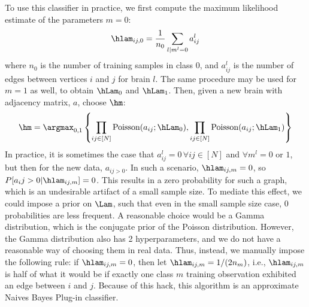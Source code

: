 \documentclass{article}
\begin{document}
To use this classifier in practice, we first compute the maximum likelihood estimate of the parameters $m=0$:
\begin{align}
	\hlam_{ij,0} = \frac{1}{n_0}\sum_{l | m^l = 0} a_{ij}^l
\end{align}
where $n_0$ is the number of training samples in class $0$, and $a_{ij}^l$ is the number of edges between vertices $i$ and $j$ for brain $l$.  The same procedure may be used for $m=1$ as well, to obtain $\hLam_0$ and $\hLam_1$.  Then, given a new brain with adjacency matrix, $a$, choose $\hm$:
\begin{align}
	\hm = \argmax_{0,1} \left\{\prod_{ij \in [N]} \text{Poisson}(a_{ij}; \hLam_0), \prod_{ij \in [N]} \text{Poisson}(a_{ij}; \hLam_1)\right\}
\end{align}
In practice, it is sometimes the case that $a_{ij}^l=0 \, \forall ij \in [N]$ and $\forall m^l = 0$ or $1$, but then for the new data, $a_{ij>0}$.  In such a scenario, $\hlam_{ij,m}=0$, so $P[a_ij > 0 | \hlam_{ij,m}]=0$.  This results in a zero probability for such a graph, which is an undesirable artifact of a small sample size.  To mediate this effect, we could impose a prior on $\Lam$, such that even in the small sample size case, $0$ probabilities are less frequent.  A reasonable choice would be a Gamma distribution, which is the conjugate prior of the Poisson distribution.  However, the Gamma distribution also has 2 hyperparameters, and we do not have a reasonable way of choosing them in real data.  Thus, instead, we manually impose the following rule: if $\hlam_{ij,m}=0$, then let $\hlam_{ij,m}=1/(2 n_m)$, i.e., $\hlam_{ij,m}$ is half of what it would be if exactly one class $m$ training observation exhibited an edge between $i$ and $j$. Because of this hack, this algorithm is an approximate Naives Bayes Plug-in classifier.
% 
\end{document}
